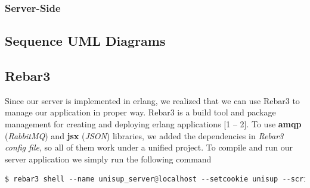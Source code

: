 \subsubsection{Server-Side}

\subsection{Sequence UML Diagrams}

\subsection{Rebar3}
Since our server is implemented in erlang, we realized that we can use Rebar3 to manage our application in proper way. Rebar3 is a build tool and package management for creating and deploying erlang applications [1 – 2]. To use \textbf{amqp} (\textit{RabbitMQ}) and \textbf{jsx} (\textit{JSON}) libraries, we added the dependencies in \textit{Rebar3 config file}, so all of them work under a unified project. To compile and run our server application we simply run the following command

\begin{lstlisting}[language=python]
	$ rebar3 shell --name unisup_server@localhost --setcookie unisup --script src/run\_listener.escript
\end{lstlisting}

